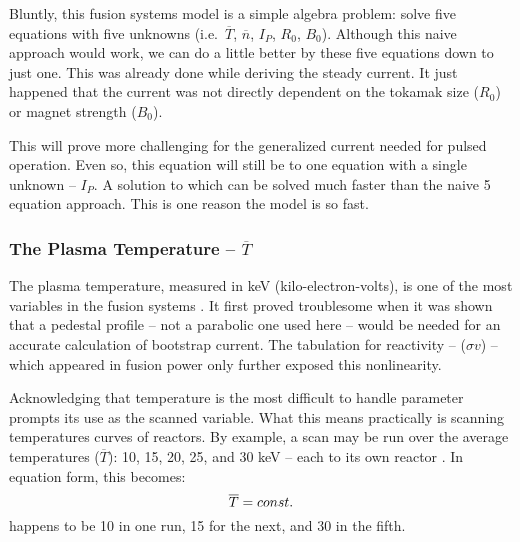 Bluntly, this fusion systems model is a simple algebra problem: solve five equations with five unknowns (i.e.\ $\overline T$, $\overline n$, $I_P$, $R_0$, $B_0$). Although this naive approach would work, we can do a little better by  these five equations down to just one. This was already done while deriving the steady current. It just happened that the current was not directly dependent on the tokamak size ($R_0$) or magnet strength ($B_0$). 

This will prove more challenging for the generalized current needed for pulsed operation. Even so, this equation will still be  to one equation with a single unknown -- $I_P$. A solution to which can be solved much faster than the naive 5 equation approach. This is one reason the model is so fast. 

\subsubsection{The Plasma Temperature -- $\overline T$}

The plasma temperature, measured in keV (kilo-electron-volts), is one of the most  variables in the fusion systems . It first proved troublesome when it was shown that a pedestal profile -- not a parabolic one used here -- would be needed for an accurate calculation of bootstrap current. The  tabulation for reactivity -- ($\sigma v$) -- which appeared in fusion power only further exposed this nonlinearity.

Acknowledging that temperature is the most difficult to handle parameter prompts its use as the scanned variable. What this means practically is scanning temperatures  curves of reactors. By example, a scan may be run over the average temperatures ($\overline T$): 10, 15, 20, 25, and 30 keV --  each  to its own reactor . In equation form, this becomes:
\begin{equation}
	\label{eq:tbar}
	\overline T = const.
	\myequations{Scanned Temperature -- $\overline T$}
\end{equation}
 happens to be 10  in one run, 15  for the next, and 30  in the fifth.

